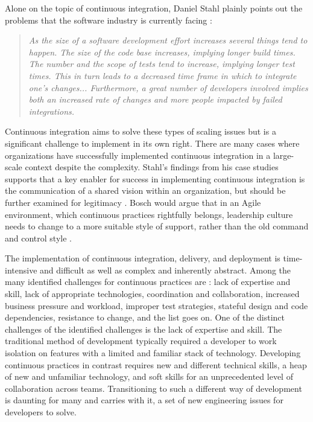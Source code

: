 \documentclass[12pt,a4paper]{article}
\begin{document}
Alone on the topic of continuous integration, Daniel Stahl plainly points out the problems that the software industry is currently facing \cite[p. ~60]{stahl_2017}:

\begin{quotation}
    \textit{As the size of a software development effort increases several things tend to happen. The size of the code base increases, implying longer build times. The number and the scope of tests tend to increase, implying longer test times. This in turn leads to a decreased time frame in which to integrate one's changes... Furthermore, a great number of developers involved implies both an increased rate of changes and more people impacted by failed integrations.}
\end{quotation}

Continuous integration aims to solve these types of scaling issues but is a significant challenge to implement in its own right. There are many cases where organizations have successfully implemented continuous integration in a large-scale context despite the complexity. Stahl's findings from his case studies supports that a key enabler for success in implementing continuous integration is the communication of a shared vision within an organization, but should be further examined for legitimacy \cite[p. ~86]{stahl_2017}. Bosch would argue that in an Agile environment, which continuous practices rightfully belongs, leadership culture needs to change to a more suitable style of support, rather than the old command and control style \cite[p. ~209]{bosch_2014}.

The implementation of continuous integration, delivery, and deployment is time-intensive and difficult as well as complex and inherently abstract. Among the many identified challenges for continuous practices are \cite[p. ~3925-3927]{shahin_babar_zhu_2017}: lack of expertise and skill, lack of appropriate technologies, coordination and collaboration, increased business pressure and workload, improper test strategies, stateful design and code dependencies, resistance to change, and the list goes on. One of the distinct challenges of the identified challenges is the lack of expertise and skill. The traditional method of development typically required a developer to work isolation on features with a limited and familiar stack of technology. Developing continuous practices in contrast requires new and different technical skills, a heap of new and unfamiliar technology, and soft skills for an unprecedented level of collaboration across teams. Transitioning to such a different way of development is daunting for many and carries with it, a set of new engineering issues for developers to solve.
\end{document}
